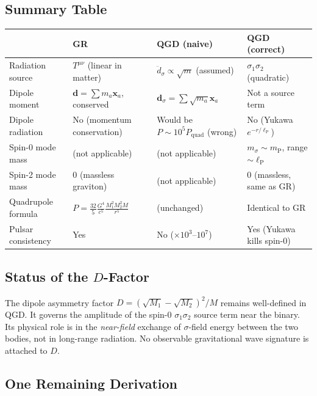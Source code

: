 \documentclass[12pt,a4paper]{article}
\newcommand{\lP}{\ell_{\mathrm{P}}}
\begin{document}
\subsection{Summary Table}

\begin{center}
\renewcommand{\arraystretch}{1.35}
\begin{tabular}{p{3cm}p{4cm}p{4cm}p{3cm}}
\toprule
 & GR & QGD (naive) & QGD (correct)\\
\midrule
Radiation source
  & $T^{\mu\nu}$ (linear in matter)
  & $\ddot{d}_\sigma \propto \sqrt{m}$ (assumed)
  & $\sigma_1\sigma_2$ (quadratic)\\[4pt]
Dipole moment
  & $\mathbf{d}=\sum m_a\mathbf{x}_a$, conserved
  & $\mathbf{d}_\sigma=\sum\sqrt{m_a}\mathbf{x}_a$
  & Not a source term\\[4pt]
Dipole radiation
  & No (momentum conservation)
  & Would be $P\sim10^5 P_\mathrm{quad}$ (wrong)
  & No (Yukawa $e^{-r/\lP}$)\\[4pt]
Spin-0 mode mass
  & (not applicable)
  & (not applicable)
  & $m_\sigma\sim m_\mathrm{P}$, range $\sim\lP$\\[4pt]
Spin-2 mode mass
  & $0$ (massless graviton)
  & (not applicable)
  & $0$ (massless, same as GR)\\[4pt]
Quadrupole formula
  & $P=\frac{32}{5}\frac{G^4}{c^5}\frac{M_1^2M_2^2M}{r^5}$
  & (unchanged)
  & Identical to GR\\[4pt]
Pulsar consistency
  & Yes
  & No ($\times10^3$--$10^7$)
  & Yes (Yukawa kills spin-0)\\
\bottomrule
\end{tabular}
\end{center}

\subsection{Status of the $D$-Factor}

The dipole asymmetry factor $D = (\sqrt{M_1}-\sqrt{M_2})^2/M$ remains
well-defined in QGD. It governs the amplitude of the spin-0
$\sigma_1\sigma_2$ source term near the binary.
Its physical role is in the \textit{near-field} exchange of $\sigma$-field
energy between the two bodies, not in long-range radiation.
No observable gravitational wave signature is attached to $D$.

\subsection{One Remaining Derivation}
\end{document}
